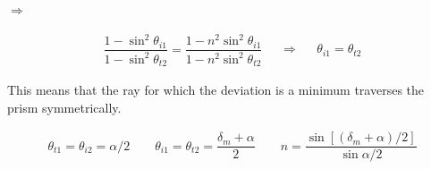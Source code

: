 $\Rightarrow $

\begin{equation*}
  \begin{aligned}
    \dfrac{1 - \sin^2 \theta_{i1}}{1 - \sin^2 \theta_{t2}} = \dfrac{1 - n^2 \sin^2 \theta_{i1}}{1 - n^2 \sin^2 \theta_{t2}}  
  \end{aligned}
  \quad \Rightarrow \quad 
  \begin{aligned}
    \theta_{i1} = \theta_{t2}
  \end{aligned}
\end{equation*}

This means that the ray for which the deviation is a minimum traverses the prism symmetrically.

\begin{equation*}
  \begin{aligned}
    \theta_{t1} = \theta_{i2} = \alpha / 2 \quad\quad \theta_{i1} = \theta_{t2} = \dfrac{\delta_m + \alpha}{2} \quad\quad n = \dfrac{\sin \left[ \left( \delta_m + \alpha \right) / 2 \right]}{\sin \alpha / 2}  
  \end{aligned}
\end{equation*}

